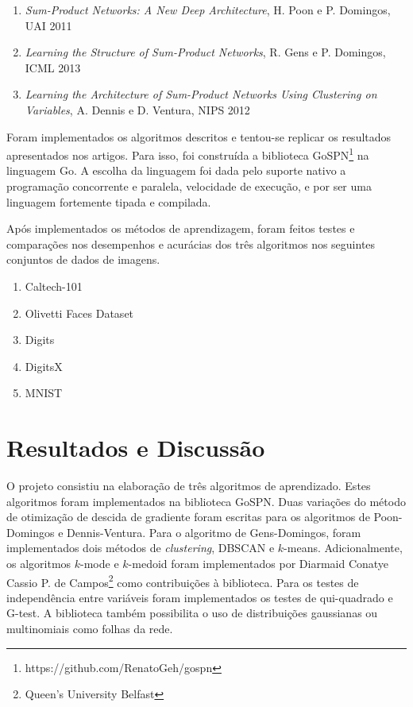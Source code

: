 \documentclass[12pt]{article}
\theoremstyle{plain}
\numberwithin{equation}{section}
\begin{document}
\begin{enumerate}
  \item \textit{Sum-Product Networks: A New Deep Architecture}, H. Poon e P. Domingos, UAI
    2011~\cite{poon-domingos}
  \item \textit{Learning the Structure of Sum-Product Networks}, R. Gens e P. Domingos, ICML
    2013~\cite{gens-domingos}
  \item \textit{Learning the Architecture of Sum-Product Networks Using Clustering on Variables},
    A. Dennis e D. Ventura, NIPS 2012~\cite{clustering}
\end{enumerate}

Foram implementados os algoritmos descritos e tentou-se replicar os resultados apresentados nos
artigos. Para isso, foi construída a biblioteca GoSPN\footnote{https://github.com/RenatoGeh/gospn}
na linguagem Go. A escolha da linguagem foi dada pelo suporte nativo a programação concorrente e
paralela, velocidade de execução, e por ser uma linguagem fortemente tipada e compilada.

Após implementados os métodos de aprendizagem, foram feitos testes e comparações nos desempenhos e
acurácias dos três algoritmos nos seguintes conjuntos de dados de imagens.

\begin{enumerate}[label=\,(\alph*)]
  \item Caltech-101~\cite{caltech101}
  \item Olivetti Faces Dataset~\cite{olivetti}
  \item Digits~\cite{digits}
  \item DigitsX~\cite{digitsx}
  \item MNIST~\cite{mnist}
\end{enumerate}

\section{Resultados e Discussão}

O projeto consistiu na elaboração de três algoritmos de aprendizado. Estes algoritmos foram
implementados na biblioteca GoSPN\footnotemark[1]. Duas variações do método de otimização de
descida de gradiente foram escritas para os algoritmos de Poon-Domingos e Dennis-Ventura. Para o
algoritmo de Gens-Domingos, foram implementados dois métodos de \textit{clustering}, DBSCAN e
$k$-means. Adicionalmente, os algoritmos $k$-mode e $k$-medoid foram implementados por Diarmaid
Conaty\footnotemark[2] e Cassio P. de Campos\footnote{Queen's University Belfast} como
contribuições à biblioteca. Para os testes de independência entre variáveis foram implementados os
testes de qui-quadrado e G-test. A biblioteca também possibilita o uso de distribuições gaussianas
ou multinomiais como folhas da rede.
\end{document}
